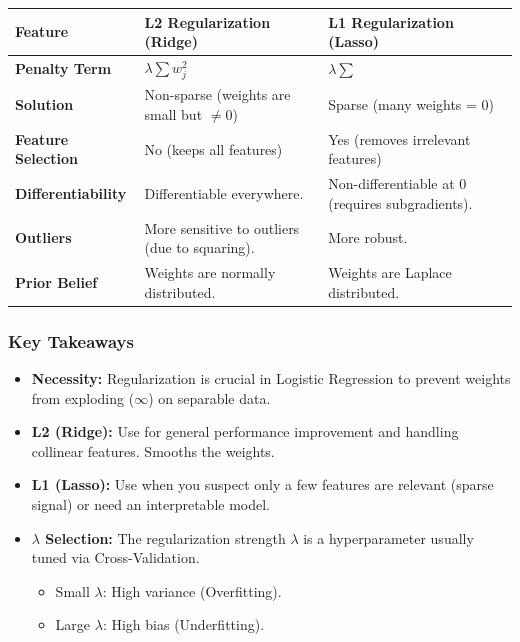 \documentclass[
  italian,
  11pt,
]{article}
\newcounter{none} %
\providecommand{\tightlist}{%
  \setlength{\itemsep}{0pt}\setlength{\parskip}{0pt}}
\begin{document}
{\def\LTcaptype{none} %
\begin{longtable}[]{@{}
  >{\raggedright\arraybackslash}p{}
  >{\raggedright\arraybackslash}p{}
  >{\raggedright\arraybackslash}p{}@{}}
\toprule\noalign{}
\begin{minipage}[b]{\linewidth}\raggedright
Feature
\end{minipage} & \begin{minipage}[b]{\linewidth}\raggedright
L2 Regularization (Ridge)
\end{minipage} & \begin{minipage}[b]{\linewidth}\raggedright
L1 Regularization (Lasso)
\end{minipage} \\
\midrule\noalign{}
\endhead
\bottomrule\noalign{}
\endlastfoot
\textbf{Penalty Term} & \(\lambda \sum w_j^2\) & \(\lambda \sum\) \\
\textbf{Solution} & Non-sparse (weights are small but \(\neq 0\)) &
Sparse (many weights = \(0\)) \\
\textbf{Feature Selection} & No (keeps all features) & Yes (removes
irrelevant features) \\
\textbf{Differentiability} & Differentiable everywhere. &
Non-differentiable at \(0\) (requires subgradients). \\
\textbf{Outliers} & More sensitive to outliers (due to squaring). & More
robust. \\
\textbf{Prior Belief} & Weights are normally distributed. & Weights are
Laplace distributed. \\
\end{longtable}
}

\subsubsection{Key Takeaways}\label{key-takeaways-9}

\begin{itemize}
\tightlist
\item
  \textbf{Necessity:} Regularization is crucial in Logistic Regression
  to prevent weights from exploding (\(\infty\)) on separable data.
\item
  \textbf{L2 (Ridge):} Use for general performance improvement and
  handling collinear features. Smooths the weights.
\item
  \textbf{L1 (Lasso):} Use when you suspect only a few features are
  relevant (sparse signal) or need an interpretable model.
\item
  \textbf{\(\lambda\) Selection:} The regularization strength
  \(\lambda\) is a hyperparameter usually tuned via Cross-Validation.

  \begin{itemize}
  \tightlist
  \item
    Small \(\lambda\): High variance (Overfitting).
  \item
    Large \(\lambda\): High bias (Underfitting).
  \end{itemize}
\end{itemize}
\end{document}
